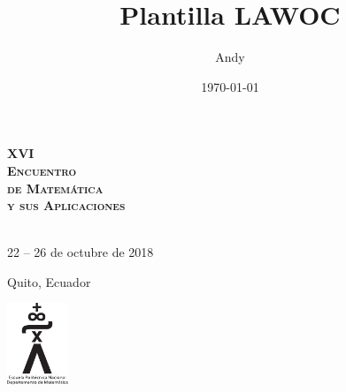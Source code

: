 \documentclass[a5paper,doc,10pt,noapacite]{apa6}
\title{Plantilla LAWOC}
\author{Andy}
\date{\today}
\begin{document}
\pagestyle{empty}
{
	\HUGE
	{\bf\textsc{XVI \\[0.5cm] Encuentro  \\[0.5cm] de Matemática \\[0.5cm] y sus Aplicaciones \\[0.5cm] }}
	\\[1cm]
	\large
	
	\vspace{-1.5cm}
	\begin{center}
		22 -- 26 de octubre de 2018
		
		\vspace{1.5\baselineskip}
		
		Quito, Ecuador
	\end{center}
}

\vspace{2cm}
\begin{center}
	\includegraphics[height=2.45cm]{Logos/DM-EPN}
\end{center}
\end{document}
